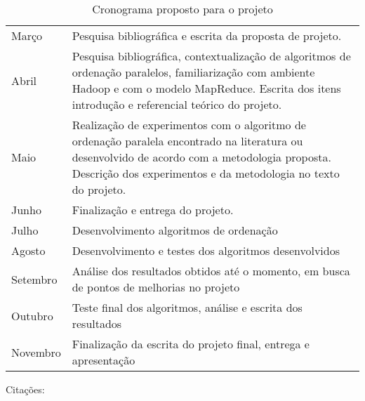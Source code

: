 \begin{table}[h]
\begin{center}
\renewcommand{\arraystretch}{1.5}
\setlength\tabcolsep{7pt}

\begin{tabular}{|p{2cm} p{11.5cm}|}
\hline
Março & Pesquisa bibliográfica e escrita da proposta de projeto. \\
Abril & Pesquisa bibliográfica, contextualização de algoritmos de ordenação paralelos, familiarização com ambiente Hadoop e com o modelo MapReduce. Escrita dos itens introdução e referencial teórico do projeto. \\
Maio & Realização de experimentos com o algoritmo de ordenação paralela encontrado na literatura ou desenvolvido de acordo com a metodologia proposta. Descrição dos experimentos e da metodologia no texto do projeto.  \\
Junho & Finalização e entrega do projeto. \\
Julho & Desenvolvimento  algoritmos de ordenação \\
Agosto & Desenvolvimento e testes dos algoritmos desenvolvidos \\
Setembro & Análise dos resultados obtidos até o momento, em busca de pontos de melhorias no projeto \\
Outubro & Teste final dos algoritmos, análise e escrita dos resultados \\
Novembro & Finalização da escrita do projeto final, entrega e apresentação \\
\hline
\end{tabular}

\caption{Cronograma proposto para o projeto}
\end{center}
\label{tab:valores}
\end{table}

Citações: \\
\cite{Kale:2010} \\
\cite{Manferdelli:2008} \\
\cite{Dean:2008} \\
\cite{Asanovic:2009}